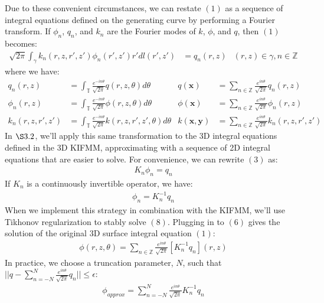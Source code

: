 \documentclass[12pt,letterpaper]{article}
\renewcommand{\le}{\leqslant}
\begin{document}
Due to these convenient circumstances, we can restate $(1)$ as a sequence of integral equations defined on the generating curve by performing a Fourier transform. If $\phi_n$, $q_n$, and $k_n$ are the Fourier modes of $k$, $\phi$, and $q$, then $(1)$ becomes:
\begin{align}
\sqrt{2\pi}\int_\gamma k_n(r,z,r',z')\phi_n(r',z')r'dl(r',z')&=q_n(r,z) &(r,z)\in\gamma, n\in\mathbb{Z}
\end{align}
where we have:
\begin{align}
q_n(r,z)&=\int_\mathbb{T}\frac{e^{-in\theta}}{\sqrt{2\pi}}q(r,z,\theta)d\theta&q(\mathbf{x})&=\sum_{n\in\mathbb{Z}}\frac{e^{in\theta}}{\sqrt{2\pi}}q_n(r,z)\\
\phi_n(r,z)&=\int_\mathbb{T}\frac{e^{-in\theta}}{\sqrt{2\pi}}\phi(r,z,\theta)d\theta&\phi(\mathbf{x})&=\sum_{n\in\mathbb{Z}}\frac{e^{in\theta}}{\sqrt{2\pi}}\phi_n(r,z)\\
k_n(r,z,r',z')&=\int_\mathbb{T}\frac{e^{-in\theta}}{\sqrt{2\pi}}k(r,z,r',z',\theta)d\theta&k(\mathbf{x},\mathbf{y})&=\sum_{n\in\mathbb{Z}}\frac{e^{in\theta}}{\sqrt{2\pi}}k_n(r,z,r',z')
\end{align}
In $\S3.2$, we'll apply this same transformation to the 3D integral equations defined in the 3D KIFMM, approximating with a sequence of 2D integral equations that are easier to solve. For convenience, we can rewrite $(3)$ as:
\begin{align}
K_n\phi_n=q_n
\end{align}
If $K_n$ is a continuously invertible operator, we have:
\begin{align}
\phi_n=K_n^{-1}q_n
\end{align}
When we implement this strategy in combination with the KIFMM, we'll use Tikhonov regularization to stably solve $(8)$. Plugging in to $(6)$ gives the solution of the original 3D surface integral equation $(1)$:
\begin{align}
\phi(r,z,\theta)=\sum_{n\in\mathbb{Z}}\frac{e^{in\theta}}{\sqrt{2\pi}}[K_n^{-1}q_n](r,z)
\end{align}
In practice, we choose a truncation parameter, $N$, such that $||q-\sum\limits_{n=-N}^{N}\frac{e^{in\theta}}{\sqrt{2\pi}}q_n||\le\epsilon$:
\begin{align}
\phi_{approx}=\sum_{n=-N}^N\frac{e^{in\theta}}{\sqrt{2\pi}}K_n^{-1}q_n
\end{align}
\end{document}
